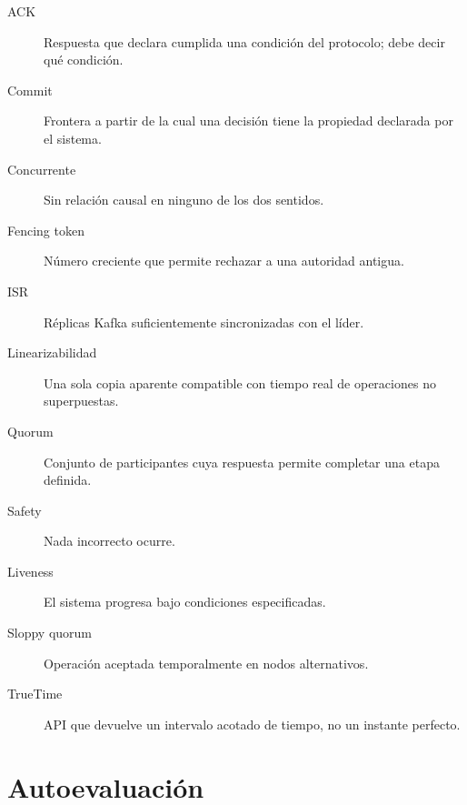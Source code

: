 \documentclass[variant=apuntes,cover=institutional,mode=screen]{ua-engineering-v6-article}
\begin{document}
\begin{description}
\item[ACK] Respuesta que declara cumplida una condición del protocolo; debe decir qué condición.
\item[Commit] Frontera a partir de la cual una decisión tiene la propiedad declarada por el sistema.
\item[Concurrente] Sin relación causal en ninguno de los dos sentidos.
\item[Fencing token] Número creciente que permite rechazar a una autoridad antigua.
\item[ISR] Réplicas Kafka suficientemente sincronizadas con el líder.
\item[Linearizabilidad] Una sola copia aparente compatible con tiempo real de operaciones no superpuestas.
\item[Quorum] Conjunto de participantes cuya respuesta permite completar una etapa definida.
\item[Safety] Nada incorrecto ocurre.
\item[Liveness] El sistema progresa bajo condiciones especificadas.
\item[Sloppy quorum] Operación aceptada temporalmente en nodos alternativos.
\item[TrueTime] API que devuelve un intervalo acotado de tiempo, no un instante perfecto.
\end{description}

\section{Autoevaluación}
\end{document}
